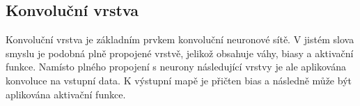 






\subsection{Konvoluční vrstva}

Konvoluční vrstva je základním prvkem konvoluční neuronové sítě. V jistém slova
smyslu je podobná plně propojené vrstvě, jelikož obsahuje váhy, biasy a
aktivační funkce. Namísto plného propojení s neurony následující vrstvy je ale
aplikována konvoluce na vstupní data. K výstupní mapě je přičten bias a
následně může být aplikována aktivační funkce.


